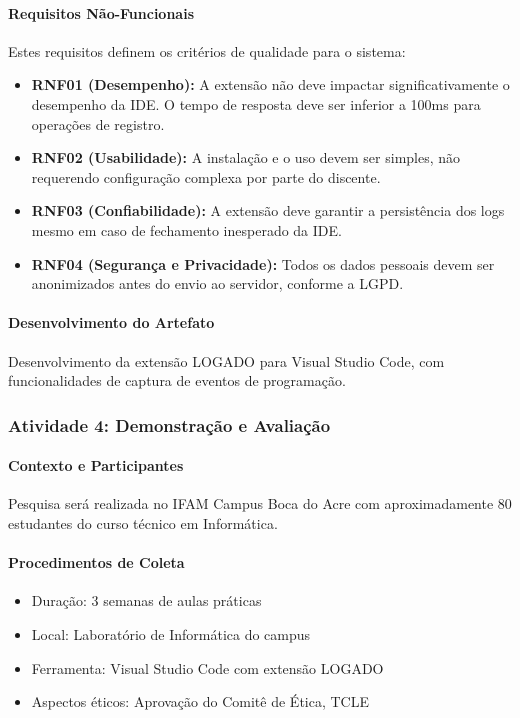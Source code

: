 \paragraph{Requisitos Não-Funcionais}
Estes requisitos definem os critérios de qualidade para o sistema:
\begin{itemize}
    \item \textbf{RNF01 (Desempenho):} A extensão não deve impactar significativamente o desempenho da IDE. O tempo de resposta deve ser inferior a 100ms para operações de registro.
    \item \textbf{RNF02 (Usabilidade):} A instalação e o uso devem ser simples, não requerendo configuração complexa por parte do discente.
    \item \textbf{RNF03 (Confiabilidade):} A extensão deve garantir a persistência dos logs mesmo em caso de fechamento inesperado da IDE.
    \item \textbf{RNF04 (Segurança e Privacidade):} Todos os dados pessoais devem ser anonimizados antes do envio ao servidor, conforme a LGPD.
\end{itemize}

\paragraph{Desenvolvimento do Artefato}
Desenvolvimento da extensão LOGADO para Visual Studio Code, com funcionalidades de captura de eventos de programação.

\subsubsection{Atividade 4: Demonstração e Avaliação}
\label{subsubsec:demonstracao-avaliacao}

\paragraph{Contexto e Participantes}
Pesquisa será realizada no IFAM Campus Boca do Acre com aproximadamente 80 estudantes do curso técnico em Informática.

\paragraph{Procedimentos de Coleta}
\begin{itemize}
    \item Duração: 3 semanas de aulas práticas
    \item Local: Laboratório de Informática do campus
    \item Ferramenta: Visual Studio Code com extensão LOGADO
    \item Aspectos éticos: Aprovação do Comitê de Ética, TCLE
\end{itemize}


